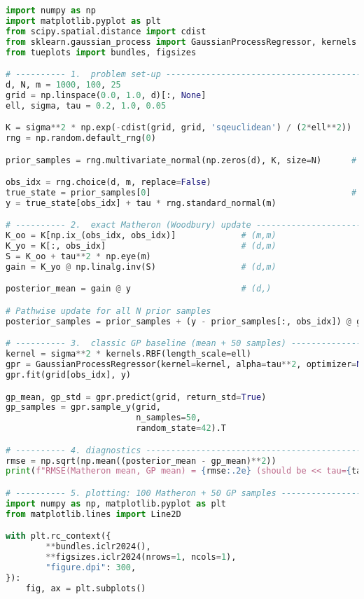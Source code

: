 \documentclass[wcp]{jmlr} %
\begin{document}
\begin{lstlisting}[language=Python, caption={Minimal Python for the experiment.}, label={lst:demo}]
import numpy as np
import matplotlib.pyplot as plt
from scipy.spatial.distance import cdist
from sklearn.gaussian_process import GaussianProcessRegressor, kernels
from tueplots import bundles, figsizes

# ---------- 1.  problem set-up ---------------------------------------------
d, N, m = 1000, 100, 25
grid = np.linspace(0.0, 1.0, d)[:, None]
ell, sigma, tau = 0.2, 1.0, 0.05

K = sigma**2 * np.exp(-cdist(grid, grid, 'sqeuclidean') / (2*ell**2))
rng = np.random.default_rng(0)

prior_samples = rng.multivariate_normal(np.zeros(d), K, size=N)      # (N,d)

obs_idx = rng.choice(d, m, replace=False)
true_state = prior_samples[0]                                        # ground truth
y = true_state[obs_idx] + tau * rng.standard_normal(m)

# ---------- 2.  exact Matheron (Woodbury) update ---------------------------
K_oo = K[np.ix_(obs_idx, obs_idx)]             # (m,m)
K_yo = K[:, obs_idx]                           # (d,m)
S = K_oo + tau**2 * np.eye(m)
gain = K_yo @ np.linalg.inv(S)                 # (d,m)

posterior_mean = gain @ y                      # (d,)

# Pathwise update for all N prior samples
posterior_samples = prior_samples + (y - prior_samples[:, obs_idx]) @ gain.T   # (N,d)

# ---------- 3.  classic GP baseline (mean + 50 samples) --------------------
kernel = sigma**2 * kernels.RBF(length_scale=ell)
gpr = GaussianProcessRegressor(kernel=kernel, alpha=tau**2, optimizer=None)
gpr.fit(grid[obs_idx], y)

gp_mean, gp_std = gpr.predict(grid, return_std=True)
gp_samples = gpr.sample_y(grid,
                          n_samples=50,
                          random_state=42).T

# ---------- 4. diagnostics -------------------------------------------------
rmse = np.sqrt(np.mean((posterior_mean - gp_mean)**2))
print(f"RMSE(Matheron mean, GP mean) = {rmse:.2e} (should be << tau={tau})")

# ---------- 5. plotting: 100 Matheron + 50 GP samples ----------------------
import numpy as np, matplotlib.pyplot as plt
from matplotlib.lines import Line2D

with plt.rc_context({
        **bundles.iclr2024(),
        **figsizes.iclr2024(nrows=1, ncols=1),
        "figure.dpi": 300,
}):
    fig, ax = plt.subplots()


\end{lstlisting}
\end{document}
